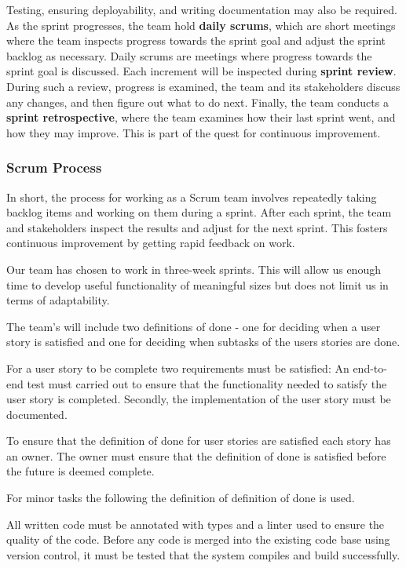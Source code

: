 Testing, ensuring deployability, and writing documentation may also be required.
As the sprint progresses, the team hold \textbf{daily scrums}, which are short meetings where the team inspects progress towards the sprint goal and adjust the sprint backlog as necessary.
Daily scrums are meetings where progress towards the sprint goal is discussed.
Each increment will be inspected during \textbf{sprint review}.
During such a review, progress is examined, the team and its stakeholders discuss any changes, and then figure out what to do next.
Finally, the team conducts a \textbf{sprint retrospective}, where the team examines how their last sprint went, and how they may improve.
This is part of the quest for continuous improvement.\cite{sutherlandScrumArtDoing2014}

\subsubsection*{Scrum Process}
In short, the process for working as a Scrum team involves repeatedly taking backlog items and working on them during a sprint.
After each sprint, the team and stakeholders inspect the results and adjust for the next sprint.
This fosters continuous improvement by getting rapid feedback on work.

Our team has chosen to work in three-week sprints.
This will allow us enough time to develop useful functionality of meaningful sizes but does not limit us in terms of adaptability.

The team's will include two definitions of done - one for deciding when a user story is satisfied and one for deciding when subtasks of the users stories are done.
\begin{dod}
    For a user story to be complete two requirements must be satisfied: An end-to-end test must carried out to ensure that the functionality needed to satisfy the user story is completed. Secondly, the implementation of the user story must be documented. 
\end{dod}
To ensure that the definition of done for user stories are satisfied each story has an owner. 
The owner must ensure that the definition of done is satisfied before the future is deemed complete.

For minor tasks the following the definition of definition of done is used. 
\begin{dod}
    All written code must be annotated with types and a linter used to ensure the quality of the code.
    Before any code is merged into the existing code base using version control, it must be tested that the system compiles and build successfully.  
\end{dod}
